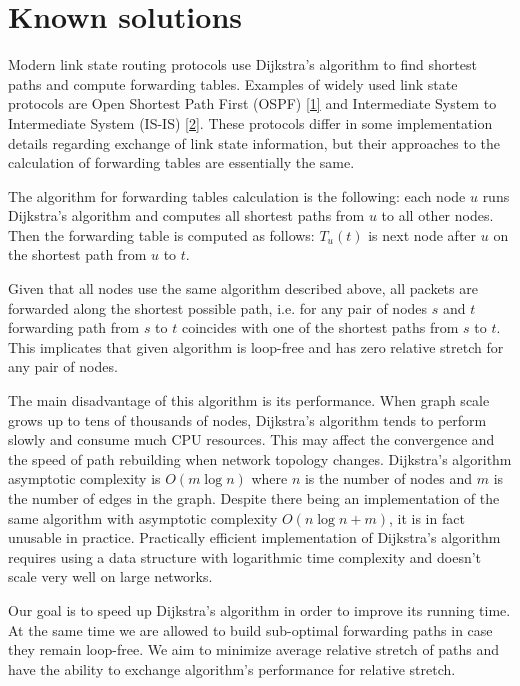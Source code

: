 \section{Known solutions}
\label{sec:known}

Modern link state routing protocols use Dijkstra's algorithm to find shortest paths and compute forwarding tables. Examples of widely used link state protocols are Open Shortest Path First (OSPF) \hyperref[ref:ospf]{[1]} and Intermediate System to Intermediate System (IS-IS) \hyperref[ref:isis]{[2]}. These protocols differ in some implementation details regarding exchange of link state information, but their approaches to the calculation of forwarding tables are essentially the same.

The algorithm for forwarding tables calculation is the following: each node $u$ runs Dijkstra's algorithm and computes all shortest paths from $u$ to all other nodes. Then the forwarding table is computed as follows: $T_u(t)$ is next node after $u$ on the shortest path from $u$ to $t$.

Given that all nodes use the same algorithm described above, all packets are forwarded along the shortest possible path, i.e. for any pair of nodes $s$ and $t$ forwarding path from $s$ to $t$ coincides with one of the shortest paths from $s$ to $t$. This implicates that given algorithm is loop-free and has zero relative stretch for any pair of nodes.

The main disadvantage of this algorithm is its performance. When graph scale grows up to tens of thousands of nodes, Dijkstra's algorithm tends to perform slowly and consume much CPU resources. This may affect the convergence and the speed of path rebuilding when network topology changes. Dijkstra's algorithm asymptotic complexity is $O(m \log n)$ where $n$ is the number of nodes and $m$ is the number of edges in the graph. Despite there being an implementation of the same algorithm with asymptotic complexity $O(n \log n + m)$, it is in fact unusable in practice. Practically efficient implementation of Dijkstra's algorithm requires using a data structure with logarithmic time complexity and doesn't scale very well on large networks.

Our goal is to speed up Dijkstra's algorithm in order to improve its running time. At the same time we are allowed to build sub-optimal forwarding paths in case they remain loop-free. We aim to minimize average relative stretch of paths and have the ability to exchange algorithm's performance for relative stretch.

